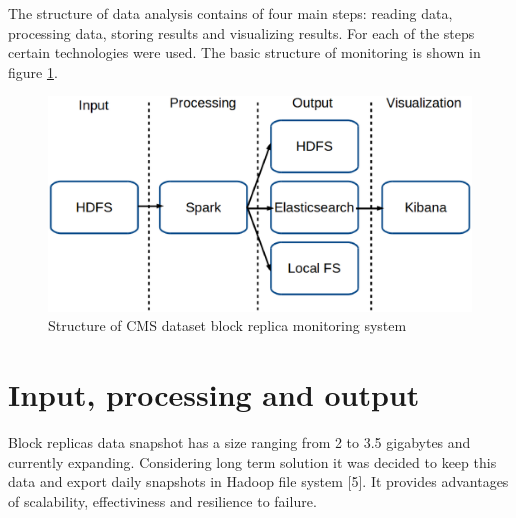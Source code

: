 \documentclass[a4paper]{jpconf}
\begin{document}
The structure of data analysis contains of four main steps: reading data, processing data, storing results and visualizing results. For each of the steps certain technologies were used. 
The basic structure of monitoring is shown in figure \ref{fig:structure}. 

\begin{figure}[h]
\begin{center}
\includegraphics[width=15cm]{structure.eps}\hspace{2pc}%
\caption{\label{fig:structure}Structure of CMS dataset block replica monitoring system}
\end{center}
\end{figure}

\section{Input, processing and output}

Block replicas data snapshot has a size ranging from 2 to 3.5 gigabytes and currently expanding. Considering long term solution it was decided to keep this data and export daily snapshots in 
Hadoop file system [5]. It provides advantages of scalability, effectiviness and resilience to failure.
\end{document}
